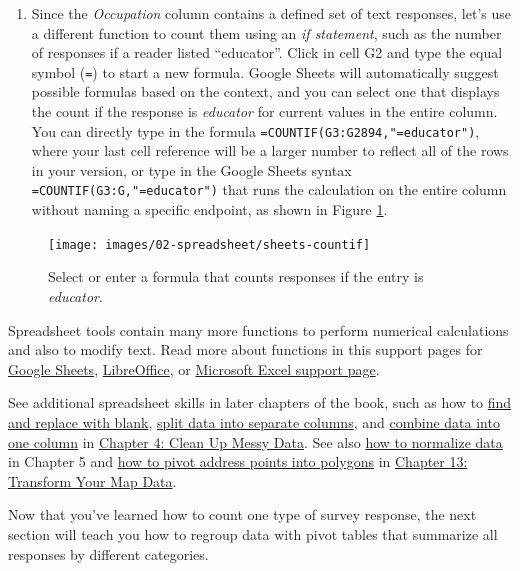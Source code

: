 \documentclass[
  english,
]{book}
\providecommand{\tightlist}{%
  \setlength{\itemsep}{0pt}\setlength{\parskip}{0pt}}
\begin{document}
\begin{enumerate}
\def\labelenumi{\arabic{enumi}.}
\setcounter{enumi}{5}
\tightlist
\item
  Since the \emph{Occupation} column contains a defined set of text responses, let's use a different function to count them using an \emph{if statement}, such as the number of responses if a reader listed ``educator''. Click in cell G2 and type the equal symbol (\texttt{=}) to start a new formula. Google Sheets will automatically suggest possible formulas based on the context, and you can select one that displays the count if the response is \emph{educator} for current values in the entire column. You can directly type in the formula \texttt{=COUNTIF(G3:G2894,"=educator")}, where your last cell reference will be a larger number to reflect all of the rows in your version, or type in the Google Sheets syntax \texttt{=COUNTIF(G3:G,"=educator")} that runs the calculation on the entire column without naming a specific endpoint, as shown in Figure \ref{fig:sheets-countif}.
\end{enumerate}



\begin{figure}
\texttt{[image: images/02-spreadsheet/sheets-countif]} \caption{Select or enter a formula that counts responses if the entry is \emph{educator}.}\label{fig:sheets-countif}
\end{figure}

Spreadsheet tools contain many more functions to perform numerical calculations and also to modify text. Read more about functions in this support pages for \href{https://support.google.com/docs/topic/9054603}{Google Sheets}, \href{https://help.libreoffice.org/Calc/Functions_by_Category}{LibreOffice}, or \href{https://support.microsoft.com/en-us/office/excel-functions-by-category-5f91f4e9-7b42-46d2-9bd1-63f26a86c0eb}{Microsoft Excel support page}.

See additional spreadsheet skills in later chapters of the book, such as how to \href{find-and-replace.html}{find and replace with blank}, \href{split-data.html}{split data into separate columns}, and \href{combine-data.html}{combine data into one column} in \href{clean.html}{Chapter 4: Clean Up Messy Data}. See also \href{normalize.html}{how to normalize data} in Chapter 5 and \href{pivot-point-to-polygon.html}{how to pivot address points into polygons} in \href{transform.html}{Chapter 13: Transform Your Map Data}.

Now that you've learned how to count one type of survey response, the next section will teach you how to regroup data with pivot tables that summarize all responses by different categories.
\end{document}
